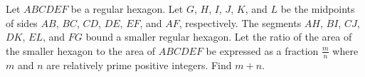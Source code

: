Let $ ABCDEF$ be a regular hexagon. Let $ G$, $ H$, $ I$, $ J$, $ K$, and $ L$ be the midpoints of sides $ AB$, $ BC$, $ CD$, $ DE$, $ EF$, and $ AF$, respectively. The segments $ AH$, $ BI$, $ CJ$, $ DK$, $ EL$, and $ FG$ bound a smaller regular hexagon. Let the ratio of the area of the smaller hexagon to the area of $ ABCDEF$ be expressed as a fraction $ \frac {m}{n}$ where $ m$ and $ n$ are relatively prime positive integers. Find $ m + n$.